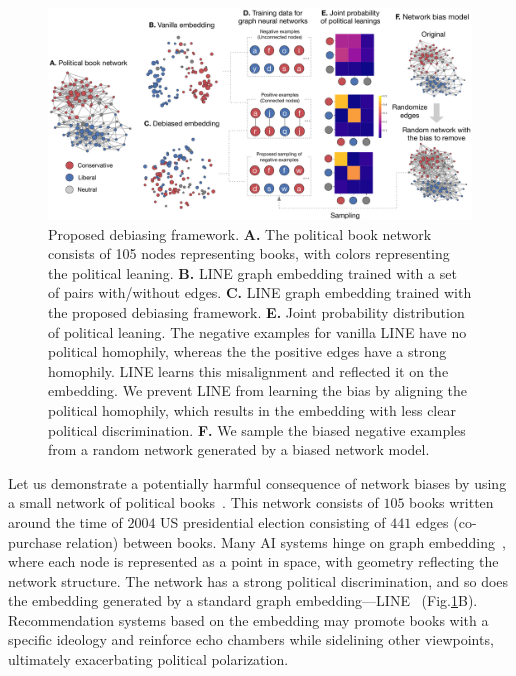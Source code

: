 \documentclass{article}
\theoremstyle{plain}
\theoremstyle{definition}
\theoremstyle{remark}
\begin{document}
\begin{figure}[tb]
\centering
\includegraphics[width=\hsize]{images/schematics.pdf}
\caption{%
    Proposed debiasing framework. 
    {\bf A.} The political book network consists of 105 nodes representing books, with colors representing the political leaning. 
    {\bf B.} LINE graph embedding trained with a set of pairs with/without edges. 
    {\bf C.} LINE graph embedding trained with the proposed 
    debiasing framework.
    {\bf E.} Joint probability distribution of political leaning. The negative examples for vanilla LINE have no political homophily, whereas the the positive edges have a strong homophily. LINE learns this misalignment and reflected it on the embedding.
    We prevent LINE from learning the bias by aligning the political homophily, which results in the embedding with less clear political discrimination. 
    {\bf F.}  We sample the biased negative examples from a random network generated by a biased network model.  
    }
    \label{fig:polbook-demonstration}
\end{figure}

Let us demonstrate a potentially harmful consequence of network biases by using a small network of political books~\cite{SocialOrganizationalNetwork}.
This network consists of $105$ books written around the time of $2004$ US presidential election consisting of $441$ edges (co-purchase relation) between books.
Many AI systems hinge on graph embedding~\cite{groverNode2vecScalableFeature2016,DBLP:journals/corr/HamiltonYL17,perozziDeepWalkOnlineLearning2014,https://doi.org/10.48550/arxiv.1710.10903}, where each node is represented as a point in space, with geometry reflecting the network structure.
The network has a strong political discrimination, and so does the embedding generated by a standard graph embedding---LINE~\cite{tangLINELargescaleInformation2015} (Fig.\ref{fig:polbook-demonstration}B).
Recommendation systems based on the embedding 
may promote books with a specific ideology and reinforce echo chambers while sidelining other viewpoints, ultimately exacerbating political polarization. 
\end{document}
